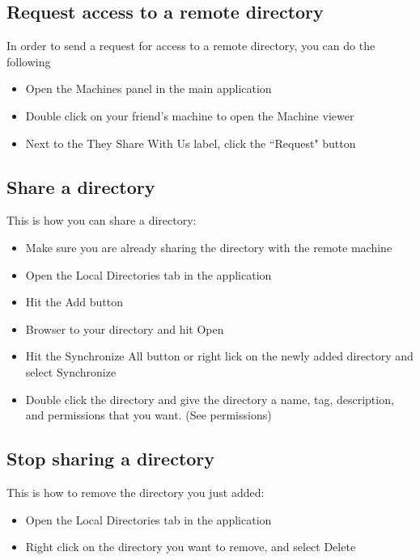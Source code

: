 \documentclass{article}
\begin{document}
\subsection{Request access to a remote directory}
In order to send a request for access to a remote directory, you can do the following
\begin{itemize}
  \item Open the Machines panel in the main application
  \item Double click on your friend's machine to open the Machine viewer
  \item Next to the They Share With Us label, click the ``Request" button
\end{itemize}

\subsection{Share a directory}
This is how you can share a directory:
\begin{itemize}
  \item Make sure you are already sharing the directory with the remote machine
  \item Open the Local Directories tab in the application
  \item Hit the Add button
  \item Browser to your directory and hit Open
  \item Hit the Synchronize All button or right lick on the newly added directory and select Synchronize
  \item Double click the directory and give the directory a name, tag, description, and permissions that you want. (See permissions)
\end{itemize}

\subsection{Stop sharing a directory}
This is how to remove the directory you just added:
\begin{itemize}
  \item Open the Local Directories tab in the application
  \item Right click on the directory you want to remove, and select Delete
\end{itemize}
\end{document}
